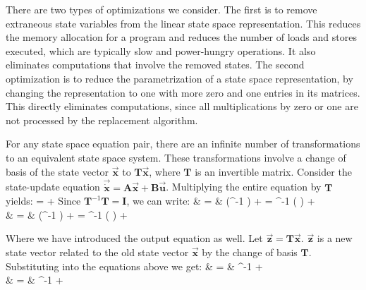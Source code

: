 \label{sec:optimization}

There are two types of optimizations we consider.  The first is to
remove extraneous state variables from the linear state space
representation. This reduces the memory allocation for a program and
reduces the number of loads and stores executed, which are typically
slow and power-hungry operations. It also eliminates computations that
involve the removed states.  The second optimization is to reduce the
parametrization of a state space representation, by changing the
representation to one with more zero and one entries in its
matrices. This directly eliminates computations, since all
multiplications by zero or one are not processed by the replacement
algorithm.


For any state space equation pair, there are an infinite number of
transformations to an equivalent state space system.  These
transformations involve a change of basis of the state vector
$\vec{\mathbf{x}}$ to $\mathbf{T} \vec{\mathbf{x}}$, where
$\mathbf{T}$ is an invertible matrix. Consider the state-update
equation $\vec{\dot{\mathbf{x}}} = \mathbf{A} \vec{\mathbf{x}} +
\mathbf{B} \vec{\mathbf{u}}$. Multiplying the entire equation by
$\mathbf{T}$ yields:
\starteqnstar
{}  =   +
 
\doneeqnstar
Since $\mathbf{T}^{-1} \mathbf{T} = \mathbf{I}$, we can write:
\starteqnstar
{}  & = & 
(^{-1} )  + 
 = 
^{-1} ( ) +   \\
 & = &  (^{-1} )
 +   = 
^{-1} ( ) + 
\doneeqnstar

Where we have introduced the output equation as well. Let
$\vec{\mathbf{z}} = \mathbf{T} \vec{\mathbf{x}}$.
$\vec{\mathbf{z}}$ is a new state vector related to the old state
vector $\vec{\mathbf{x}}$ by the change of basis $\mathbf{T}$.
Substituting into the equations above we get:
\starteqnstar
{} & = &  ^{-1}  +   \\
 & = &  ^{-1}
+ 
\doneeqnstar

